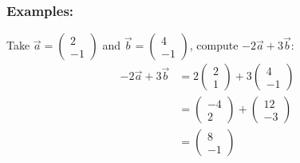 \documentclass[a4paper]{article}
\begin{document}
  \subsubsection{Examples:}
  Take $\vec{a} = (\begin{smallmatrix} 2 \\ -1\end{smallmatrix})$ and $\vec{b} = (\begin{smallmatrix} 4 \\ -1\end{smallmatrix})$, compute $-2\vec{a} + 3\vec{b}$:
  \begin{equation}
    \label{eq:1}
    \begin{split}
      -2\vec{a} + 3\vec{b} &= 2\begin{pmatrix}
       2 \\ 1 
      \end{pmatrix} + 3 \begin{pmatrix}
       4 \\ -1 
      \end{pmatrix}\\
                           &= \begin{pmatrix}
                           -4 \\ 2 
                           \end{pmatrix} + \begin{pmatrix}
                           12 \\ -3 
                           \end{pmatrix} \\
                           &= \begin{pmatrix}
                           8 \\ -1 
                           \end{pmatrix}
    \end{split}
  \end{equation}
\end{document}
